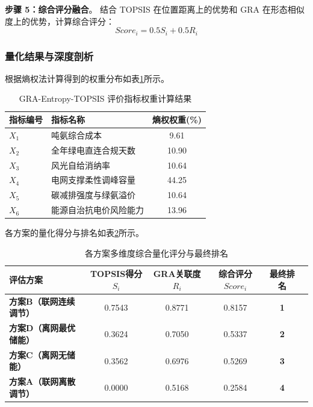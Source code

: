 \textbf{步骤 5：综合评分融合}。
结合 TOPSIS 在位置距离上的优势和 GRA 在形态相似度上的优势，计算综合评分：
\begin{equation}
Score_i = 0.5 S_i + 0.5 R_i
\end{equation}

\subsubsection{量化结果与深度剖析}

根据熵权法计算得到的权重分布如表\ref{tab:q5_weights}所示。

\begin{table}[H]
\centering
\caption{GRA-Entropy-TOPSIS 评价指标权重计算结果}\label{tab:q5_weights}
\begin{tabular}{llc}
\toprule
指标编号 & 指标名称 & 熵权权重(\%) \\
\midrule
$X_1$ & 吨氨综合成本 & 9.61 \\
$X_2$ & 全年绿电直连合规天数 & 10.90 \\
$X_3$ & 风光自给消纳率 & 10.64 \\
$X_4$ & 电网支撑柔性调峰容量 & 44.25 \\
$X_5$ & 碳减排强度与绿氨溢价 & 10.64 \\
$X_6$ & 能源自治抗电价风险能力 & 13.96 \\
\bottomrule
\end{tabular}
\end{table}

各方案的量化得分与排名如表\ref{tab:q5_ranking}所示。

\begin{table}[H]
\centering
\caption{各方案多维度综合量化评分与最终排名}\label{tab:q5_ranking}
\begin{tabular}{lccccc}
\toprule
评估方案 & TOPSIS得分 $S_i$ & GRA关联度 $R_i$ & 综合评分 $Score_i$ & 最终排名 \\
\midrule
\textbf{方案B（联网连续调节）} & 0.7543 & 0.8771 & 0.8157 & \textbf{1} \\
\textbf{方案D（离网最优储能）} & 0.3624 & 0.7050 & 0.5337 & \textbf{2} \\
\textbf{方案C（离网无储能）}   & 0.3562 & 0.6976 & 0.5269 & \textbf{3} \\
\textbf{方案A（联网离散调节）} & 0.0000 & 0.5168 & 0.2584 & \textbf{4} \\
\bottomrule
\end{tabular}
\end{table}

